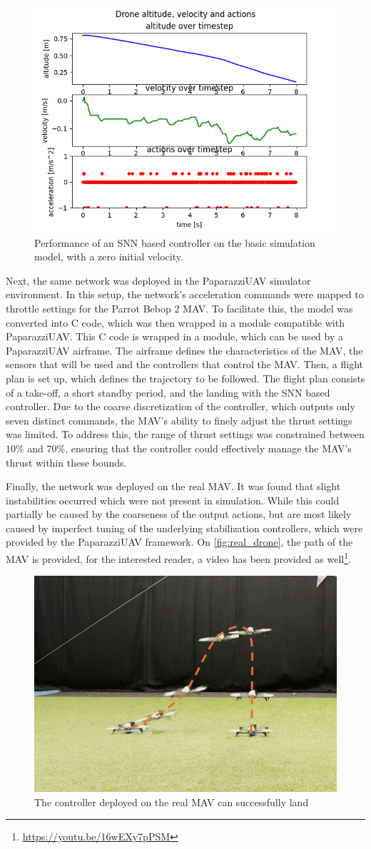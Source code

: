 \begin{figure}[h!]
    \centering
    \includegraphics[width=.45\textwidth]{chapters/drone_landing_seed3_v00_drone_snn_pos_06-05-02.png}
    \caption{Performance of an SNN based controller on the basic simulation model, with a zero initial velocity.}
    \label{fig:Performance0vel}
\end{figure}

Next, the same network was deployed in the PaparazziUAV simulator environment. In this setup, the network's acceleration commands were mapped to throttle settings for the Parrot Bebop 2 MAV. To facilitate this, the model was converted into C code, which was then wrapped in a module compatible with PaparazziUAV. This C code is wrapped in a module, which can be used by a PaparazziUAV airframe. The airframe defines the characteristics of the MAV, the sensors that will be used and the controllers that control the MAV. Then, a flight plan is set up, which defines the trajectory to be followed. The flight plan consists of a take-off, a short standby period, and the landing with the SNN based controller.
Due to the coarse discretization of the controller, which outputs only seven distinct commands, the MAV's ability to finely adjust the thrust settings was limited. To address this, the range of thrust settings was constrained between $10\%$ and $70\%$, ensuring that the controller could effectively manage the MAV's thrust within these bounds.

Finally, the network was deployed on the real MAV. It was found that slight instabilities occurred which were not present in simulation. While this could partially be caused by the coarseness of the output actions, but are most likely caused by imperfect tuning of the underlying stabilization controllers, which were provided by the PaparazziUAV framework. On \autoref{fig:real_drone}, the path of the MAV is provided, for the interested reader, a video has been provided as well\footnote{\url{https://youtu.be/16wEXy7pPSM}}.
\begin{figure}
    \centering
    \includegraphics[width=.45\textwidth]{Figures/drone_landing/Drone_Landing_Burst.png}
    \caption{The controller deployed on the real MAV can successfully land}
    \label{fig:real_drone}
\end{figure}

